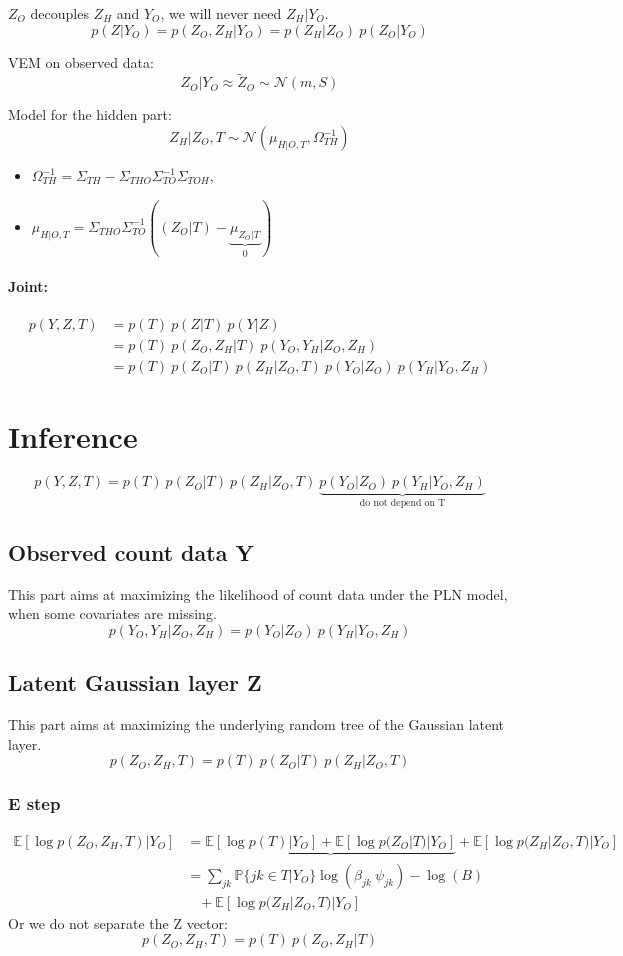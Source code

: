 \documentclass[11pt,a4paper]{article}
\newcommand{\Esp}{\mathds{E}}
\begin{document}
$Z_O$ decouples $Z_H$ and $Y_O$, we will never need $Z_H|Y_O$.
$$ p(Z|Y_O) = p(Z_O,Z_H | Y_O) = p(Z_H|Z_O) \: p(Z_O|Y_O) $$


VEM on observed data: $$Z_O|Y_O \approx \widetilde{Z}_O \sim \mathcal{N}(m,S)$$

Model for the hidden part: $$Z_H|Z_O,T \sim \mathcal{N}(\mu_{H|O,T}, \Omega_{TH}^{-1})$$ 

\begin{itemize}
\item $\Omega_{TH}^{-1} = \Sigma_{TH} -\Sigma_{THO}\Sigma_{TO}^{-1}\Sigma_{TOH}$, 

\item $\mu_{H|O,T} = \Sigma_{THO}\Sigma_{TO}^{-1}((Z_O|T)-\underbrace{\mu_{Z_O|T}}_{0})$ \\
 
\end{itemize}

\paragraph{Joint:}
\begin{align*}
p(Y,Z,T)& = p(T) \: p(Z|T) \: p(Y|Z) \\
&= p(T)\: p(Z_O,Z_H|T) \: p(Y_O,Y_H|Z_O,Z_H) \\
&= p(T) \: p(Z_O|T) \: p(Z_H | Z_O,T)  \: p(Y_O|Z_O) \: p(Y_H|Y_O,Z_H)
\end{align*} 

\section{Inference}
$$p(Y,Z,T)= p(T) \: p(Z_O|T) \: p(Z_H | Z_O,T)  \: \underbrace{p(Y_O|Z_O) \: p(Y_H|Y_O,Z_H)}_{\text{do not depend on T}}$$
\subsection{Observed count data Y}
This part aims at maximizing the likelihood of count data under the PLN model, when some covariates are missing. 
$$p(Y_O,Y_H|Z_O,Z_H) = p(Y_O|Z_O) \: p(Y_H|Y_O,Z_H)$$
\subsection{Latent Gaussian layer Z}
This part aims at maximizing the underlying random tree of the Gaussian latent layer.
$$p(Z_O,Z_H,T) = p(T) \: p(Z_O|T) \: p(Z_H | Z_O,T)$$
\subsubsection{E step}
\begin{align*}
 \Esp[\log p(Z_O,Z_H,T) | Y_O ] &=  \underbrace{\Esp[\log p(T)|Y_O] +  \Esp[\log p(Z_O|T)|Y_O] }+  \Esp[\log p(Z_H|Z_O,T)|Y_O]\\
 &= \sum_{jk}\mathds{P}\{jk \in T | Y_O\} \log(\beta_{jk} \: \psi_{jk}) - \log(B) \\
 &\;\;\; + \Esp[\log p(Z_H|Z_O,T)|Y_O]
\end{align*} 
Or we do not separate the Z vector:
$$p(Z_O,Z_H,T) = p(T) \: p(Z_O,Z_H|T)$$
\end{document}
